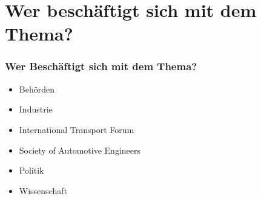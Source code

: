 \section{Wer beschäftigt sich mit dem Thema?}

\begin{frame}
    \frametitle{Wer Beschäftigt sich mit dem Thema?}

    \begin{itemize}
        \item Behörden
        \item Industrie
        \item International Transport Forum \cite{websiteITF}
        \item Society of Automotive Engineers \cite{websiteSAE}
        \item Politik
        \item Wissenschaft
    \end{itemize}
\end{frame}